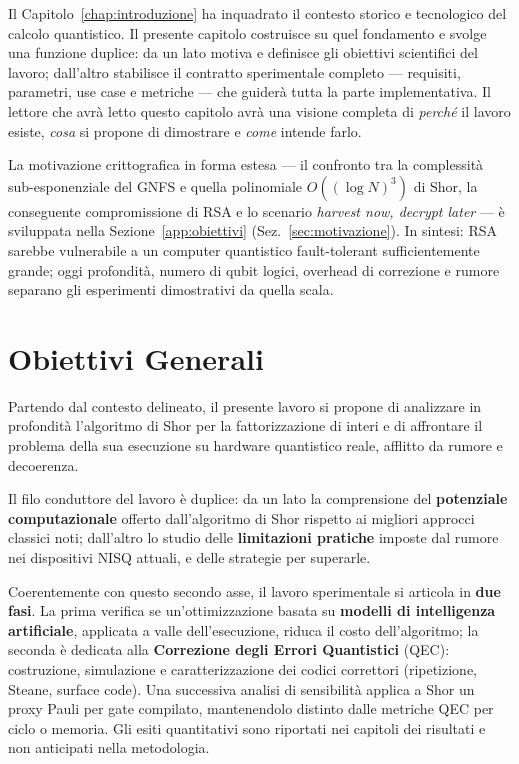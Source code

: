 \begin{onehalfspace}

Il Capitolo~\ref{chap:introduzione} ha inquadrato il contesto storico e tecnologico del calcolo quantistico. Il presente capitolo costruisce su quel fondamento e svolge una funzione duplice: da un lato motiva e definisce gli obiettivi scientifici del lavoro; dall'altro stabilisce il contratto sperimentale completo --- requisiti, parametri, use case e metriche --- che guiderà tutta la parte implementativa. Il lettore che avrà letto questo capitolo avrà una visione completa di \textit{perché} il lavoro esiste, \textit{cosa} si propone di dimostrare e \textit{come} intende farlo.

La motivazione crittografica in forma estesa --- il confronto tra la complessità sub-esponenziale del \ac{GNFS} e quella polinomiale $O((\log N)^3)$ di Shor, la conseguente compromissione di \ac{RSA} e lo scenario \emph{harvest now, decrypt later} --- è sviluppata nella Sezione~\ref{app:obiettivi} (Sez.~\ref{sec:motivazione}). In sintesi: RSA sarebbe vulnerabile a un computer quantistico fault-tolerant sufficientemente grande; oggi profondità, numero di qubit logici, overhead di correzione e rumore separano gli esperimenti dimostrativi da quella scala.
\section{Obiettivi Generali}

Partendo dal contesto delineato, il presente lavoro si propone di analizzare in profondità l'algoritmo di Shor per la fattorizzazione di interi e di affrontare il problema della sua esecuzione su hardware quantistico reale, afflitto da rumore e decoerenza.

Il filo conduttore del lavoro è duplice: da un lato la comprensione del \textbf{potenziale computazionale} offerto dall'algoritmo di Shor rispetto ai migliori approcci classici noti; dall'altro lo studio delle \textbf{limitazioni pratiche} imposte dal rumore nei dispositivi \ac{NISQ} attuali, e delle strategie per superarle.

Coerentemente con questo secondo asse, il lavoro sperimentale si articola in \textbf{due fasi}. La prima verifica se un'ottimizzazione basata su \textbf{modelli di intelligenza artificiale}, applicata a valle dell'esecuzione, riduca il costo dell'algoritmo; la seconda è dedicata alla \textbf{Correzione degli Errori Quantistici} (\ac{QEC}): costruzione, simulazione e caratterizzazione dei codici correttori (ripetizione, Steane, surface code). Una successiva analisi di sensibilità applica a Shor un proxy Pauli per gate compilato, mantenendolo distinto dalle metriche QEC per ciclo o memoria. Gli esiti quantitativi sono riportati nei capitoli dei risultati e non anticipati nella metodologia.


\end{onehalfspace}
